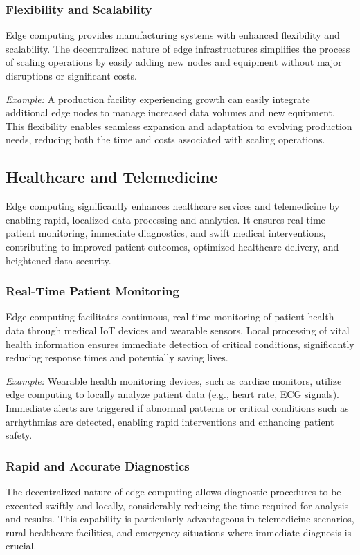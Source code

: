 \documentclass[runningheads]{llncs}
\begin{document}
\subsubsection{Flexibility and Scalability}
Edge computing provides manufacturing systems with enhanced flexibility and scalability. The decentralized nature of edge infrastructures simplifies the process of scaling operations by easily adding new nodes and equipment without major disruptions or significant costs.

\textit{Example:} A production facility experiencing growth can easily integrate additional edge nodes to manage increased data volumes and new equipment. This flexibility enables seamless expansion and adaptation to evolving production needs, reducing both the time and costs associated with scaling operations.


\subsection{Healthcare and Telemedicine}

Edge computing significantly enhances healthcare services and telemedicine by enabling rapid, localized data processing and analytics. It ensures real-time patient monitoring, immediate diagnostics, and swift medical interventions, contributing to improved patient outcomes, optimized healthcare delivery, and heightened data security.

\subsubsection{Real-Time Patient Monitoring}
Edge computing facilitates continuous, real-time monitoring of patient health data through medical IoT devices and wearable sensors. Local processing of vital health information ensures immediate detection of critical conditions, significantly reducing response times and potentially saving lives.

\textit{Example:} Wearable health monitoring devices, such as cardiac monitors, utilize edge computing to locally analyze patient data (e.g., heart rate, ECG signals). Immediate alerts are triggered if abnormal patterns or critical conditions such as arrhythmias are detected, enabling rapid interventions and enhancing patient safety.

\subsubsection{Rapid and Accurate Diagnostics}
The decentralized nature of edge computing allows diagnostic procedures to be executed swiftly and locally, considerably reducing the time required for analysis and results. This capability is particularly advantageous in telemedicine scenarios, rural healthcare facilities, and emergency situations where immediate diagnosis is crucial.
\end{document}
